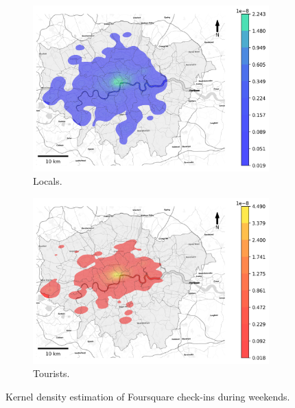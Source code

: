 \documentclass{article}
\theoremstyle{definition}
\theoremstyle{remark}
\begin{document}
\begin{figure}[!h]

\begin{subfigure}{0.5\textwidth}
\includegraphics[width=1\linewidth]{figures/kde_locals_weekend.png} 
\caption{Locals.}
\label{fig:kde_locals_weekend}
\end{subfigure}
\begin{subfigure}{0.5\textwidth}
\includegraphics[width=1\linewidth]{figures/kde_tourists_weekend.png}
\caption{Tourists.}
\label{fig:kde_tourists_weekend}
\end{subfigure}

\caption{Kernel density estimation of Foursquare check-ins during weekends.} \label{fig:kde_weekend}
\end{figure}


\end{document}
